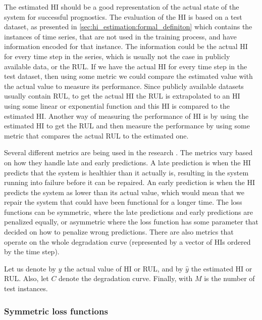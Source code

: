 The estimated HI should be a good representation of the actual state of the system for successful prognostics.
The evaluation of the HI is based on a test dataset, as presented in
\ref{sec:hi_estimation:formal_definiton}
which contains the instances of time series, that are not used
in the training process, and have information encoded for that instance. The information could be the actual
HI for every time step in the series, which is usually not the case in publicly available data, or the RUL. If we
have the actual HI for every time step in the test dataset, then using some metric we could compare the estimated value
with the actual value to measure its performance. Since publicly available datasets usually contain RUL, to get
the actual HI the RUL is extrapolated to an HI using some linear or exponential function
\cite{DBLP:journals/corr/MalhotraTRAVAS16} and this HI is compared to the estimated HI. Another way of measuring
the performance of HI is by using the estimated HI to get the RUL and then measure the performance by using some
metric that compares the actual RUL to the estimated one.

Several different metrics are being used in the research \cite{Islam2018CalculatingAH, LI2019229,
    DBLP:journals/tie/YangHZXLN16, Mutunga2019HealthIndexBP, DBLP:journals/corr/MalhotraTRAVAS16}. The metrics vary based on how
they handle late and early predictions.
A late prediction
is when the HI predicts that the system is healthier than it actually is, resulting in the system running into
failure before it can  be repaired. An early prediction is when the HI predicts
the system as lower than its actual value, which would mean that we repair the system that could have been functional for a longer time. The loss functions can be symmetric, where the late predictions and early predictions
are penalized equally, or asymmetric where the loss function has some parameter that decided on how to penalize
wrong predictions.
There are also metrics that operate on the whole degradation curve (represented by a vector of HIs ordered by the time step)\cite{DBLP:conf/indin/AremuOHM19}.

Let us denote by $y$ the actual value of HI or RUL, and by $\hat{y}$ the
estimated HI or RUL. Also, let $C$ denote the degradation curve. Finally, with $M$ is the
number of test instances.

\subsubsection{Symmetric loss functions}

